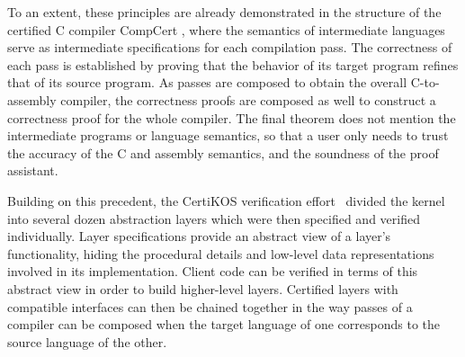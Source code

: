 \documentclass[draft,11pt]{report}
\begin{document}

To an extent,
these principles are already demonstrated in the structure of the
certified C compiler CompCert \cite{compcert},
where the semantics of intermediate languages
serve as intermediate specifications for each compilation pass.
The correctness of each pass is established by
proving that the behavior of its target program
refines that of its source program.
As passes are composed to obtain the overall
C-to-assembly compiler,
the correctness proofs are composed as well
to construct a correctness proof for the whole compiler.
The final theorem does not mention the intermediate
programs or language semantics,
so that a user only needs to trust
the accuracy of the C and assembly semantics,
and the soundness of the proof assistant.

Building on this precedent,
the CertiKOS verification effort~\cite{popl15,ccal,osdi16}
divided the kernel into several dozen abstraction layers
which were then specified and verified individually.
Layer specifications provide
an abstract view of a layer's functionality,
hiding the procedural details and low-level data representations
involved in its implementation.
Client code can be verified in terms of
this abstract view
in order to build higher-level layers.
Certified layers
with compatible interfaces can then be chained together
in the way passes of a compiler
can be composed when the target language of one
corresponds to the source language of the other.
\end{document}
